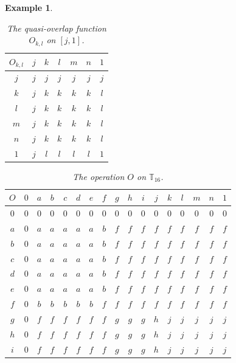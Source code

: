 \documentclass[preprint,12pt]{elsarticle}
\newtheorem{example}[theorem]{Example}
\begin{document}
\begin{example}
\begin{table}[!h]
\centering
\caption{The quasi-overlap function $O_{k,l}$ on $[j,1]$.}
\label{tab:$O_{k,l}$ on $[j,1]$}
\begin{tabular}{c|cccccc}
$O_{k,l}$&$j$&$k$&$l$&$m$&$n$&$1$\\\hline
$j$&$j$&$j$&$j$&$j$&$j$&$j$\\
$k$&$j$&$k$&$k$&$k$&$k$&$l$\\
$l$&$j$&$k$&$k$&$k$&$k$&$l$\\
$m$&$j$&$k$&$k$&$k$&$k$&$l$\\
$n$&$j$&$k$&$k$&$k$&$k$&$l$\\
$1$&$j$&$l$&$l$&$l$&$l$&$1$\\
\end{tabular}
\end{table}
\begin{table}[!h]
\centering
\caption{The operation $O$ on $\mathbb{T}_{16}$.}
\label{tab:Oeta4}
\begin{tabular}{c|cccccccccccccccc}
$O$ & $0$ & $a$ & $b$ & $c$ & $d$ & $e$ & $f$ & $g$ & $h$ & $i$ & $j$ & $k$ & $l$ & $m$ & $n$ & $1$\\
\hline
$0$ & $0$ & $0$ & $0$ & $0$ & $0$ & $0$ & $0$ & $0$ & $0$ & $0$ & $0$ & $0$ & $0$ & $0$ & $0$ & $0$\\
$a$ & $0$ & $a$ & $a$ & $a$ & $a$ & $a$ & $b$ & $f$ & $f$ & $f$ & $f$ & $f$ & $f$ & $f$ & $f$ & $f$\\
$b$ & $0$ & $a$ & $a$ & $a$ & $a$ & $a$ & $b$ & $f$ & $f$ & $f$ & $f$ & $f$ & $f$ & $f$ & $f$ & $f$\\
$c$ & $0$ & $a$ & $a$ & $a$ & $a$ & $a$ & $b$ & $f$ & $f$ & $f$ & $f$ & $f$ & $f$ & $f$ & $f$ & $f$\\
$d$ & $0$ & $a$ & $a$ & $a$ & $a$ & $a$ & $b$ & $f$ & $f$ & $f$ & $f$ & $f$ & $f$ & $f$ & $f$ & $f$\\
$e$ & $0$ & $a$ & $a$ & $a$ & $a$ & $a$ & $b$ & $f$ & $f$ & $f$ & $f$ & $f$ & $f$ & $f$ & $f$ & $f$\\
$f$ & $0$ & $b$ & $b$ & $b$ & $b$ & $b$ & $f$ & $f$ & $f$ & $f$ & $f$ & $f$ & $f$ & $f$ & $f$ & $f$\\
$g$ & $0$ & $f$ & $f$ & $f$ & $f$ & $f$ & $f$ & $g$ & $g$ & $g$ & $h$ & $j$ & $j$ & $j$ & $j$ & $j$\\
$h$ & $0$ & $f$ & $f$ & $f$ & $f$ & $f$ & $f$ & $g$ & $g$ & $g$ & $h$ & $j$ & $j$ & $j$ & $j$ & $j$\\
$i$ & $0$ & $f$ & $f$ & $f$ & $f$ & $f$ & $f$ & $g$ & $g$ & $g$ & $h$ & $j$ & $j$ & $j$ & $j$ & $j$\\

\end{tabular}
\end{table}
\end{example}
\end{document}
